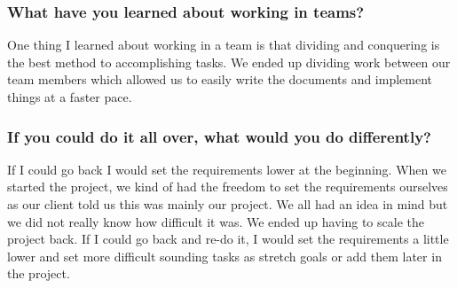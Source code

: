 \documentclass[onecolumn, draftclsnofoot,10pt, compsoc]{IEEEtran}
\begin{document}
\subsubsection{What have you learned about working in teams?}
One thing I learned about working in a team is that dividing and conquering is the best method to accomplishing tasks. We ended up dividing work between our team members which allowed us to easily write the documents and implement things at a faster pace.

\subsubsection{If you could do it all over, what would you do differently?}
If I could go back I would set the requirements lower at the beginning. When we started the project, we kind of had the freedom to set the requirements ourselves as our client told us this was mainly our project. We all had an idea in mind but we did not really know how difficult it was. We ended up having to scale the project back. If I could go back and re-do it, I would set the requirements a little lower and set more difficult sounding tasks as stretch goals or add them later in the project.
\end{document}
